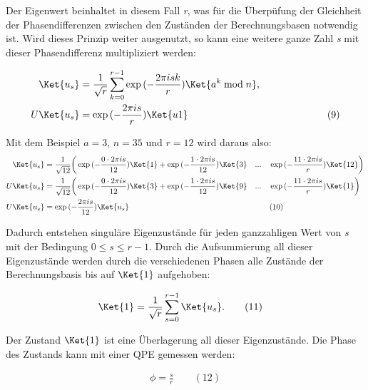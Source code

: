     Der Eigenwert beinhaltet in diesem Fall \textit{r}, was für die Überpüfung der Gleichheit der Phasendifferenzen zwischen den Zuständen der Berechnungsbasen notwendig ist. \newline
    Wird dieses Prinzip weiter ausgenutzt, so kann eine weitere ganze Zahl \textit{s} mit dieser Phasendifferenz multipliziert werden:

	\begin{align*}
	    \Ket{u_s} &= \frac{1}{\sqrt{r}} \sum_{k=0}^{r-1} \exp{(-\frac{2\pi i s k}{r})} \Ket{a^k \bmod{n}}, \\
	    U\Ket{u_s} &= \exp{(-\frac{2\pi i s}{r})}  \Ket{u1}     \quad \quad \quad \quad \quad \quad \quad \quad \quad \quad \quad \quad \quad \quad (9)
	\end{align*}


	Mit dem Beispiel \(a=3\), \(n=35\) und \(r=12\) wird daraus also:
	\begin{align*}
	    \Ket{u_s} &= \frac{1}{\sqrt{12}} \bigg( \exp{(-\frac{0\cdot 2\pi is}{12})}\Ket{1} + \exp{(-\frac{1\cdot 2\pi is}{12})}\Ket{3} \quad ... \quad \exp{(-\frac{11\cdot 2\pi is}{r})}\Ket{12} \bigg) \\
	    U\Ket{u_s} &= \frac{1}{\sqrt{12}} \bigg(\exp{(-\frac{0\cdot 2\pi is}{12})}\Ket{3} + \exp{(-\frac{1\cdot 2\pi is}{12})}\Ket{9} \quad ... \quad \exp{(-\frac{11\cdot 2\pi is}{r})}\Ket{1}\bigg) \\
	    U \Ket{u_s} &= \exp{(-\frac{2\pi i s}{12})}\Ket{u_s}  \quad \quad \quad \quad \quad \quad  \quad \quad \quad \quad \quad \quad  \quad \quad \quad \quad \quad \quad (10)
	\end{align*}


    Dadurch entstehen singuläre Eigenzustände für jeden ganzzahligen Wert von \textit{s} mit der Bedingung \(0 \leq s \leq r-1\). Durch die Aufsummierung all dieser Eigenzustände werden durch die verschiedenen Phasen alle Zustände der Berechnungsbasis bis auf \(\Ket{1}\) aufgehoben:


	\begin{align*}
	    \Ket{1} &= \frac{1}{\sqrt{r}} \sum_{s=0}^{r-1} \Ket{u_s}.  \quad \quad (11)
	\end{align*}

    Der Zustand \(\Ket{1}\) ist eine Überlagerung all dieser Eigenzustände. Die Phase des Zustands kann mit einer QPE gemessen werden:


	\begin{align*}
	    \phi = \frac{s}{r}  \quad \quad (12)
	\end{align*}

